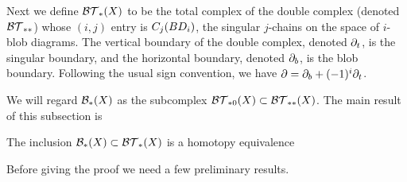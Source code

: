 Next we define ${\mathcal{BT}}_*(X)$ to be the total complex of the double complex (denoted ${\mathcal{BT}}_{**}$) 
whose $(i,j)$ entry is $C_j(BD_i)$, the singular $j$-chains on the space of $i$-blob diagrams.
The vertical boundary of the double complex,
denoted $\partial_t$, is the singular boundary, and the horizontal boundary, denoted $\partial_b$, is
the blob boundary. Following the usual sign convention, we have $\partial = \partial_b + (-1)^i \partial_t$.

We will regard ${\mathcal B}_*(X)$ as the subcomplex ${\mathcal{BT}}_{*0}(X) \subset {\mathcal{BT}}_{**}(X)$.
The main result of this subsection is

\begin{lemma} \label{lem:bc-btc}
The inclusion ${\mathcal B}_*(X) \subset {\mathcal{BT}}_*(X)$ is a homotopy equivalence
\end{lemma}

Before giving the proof we need a few preliminary results.


